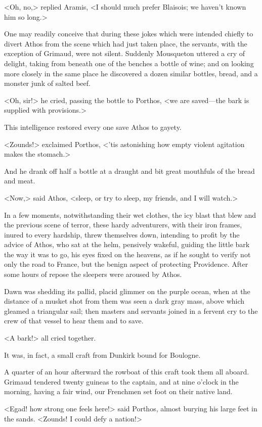 <Oh, no,> replied Aramis, <I should much prefer Blaisois; we haven't known him so long.>

One may readily conceive that during these jokes which were intended chiefly to divert Athos from the scene which had just taken place, the servants, with the exception of Grimaud, were not silent. Suddenly Mousqueton uttered a cry of delight, taking from beneath one of the benches a bottle of wine; and on looking more closely in the same place he discovered a dozen similar bottles, bread, and a monster junk of salted beef.

<Oh, sir!> he cried, passing the bottle to Porthos, <we are saved—the bark is supplied with provisions.>

This intelligence restored every one save Athos to gayety.

<Zounds!> exclaimed Porthos, <'tis astonishing how empty violent agitation makes the stomach.>

And he drank off half a bottle at a draught and bit great mouthfuls of the bread and meat.

<Now,> said Athos, <sleep, or try to sleep, my friends, and I will watch.>

In a few moments, notwithstanding their wet clothes, the icy blast that blew and the previous scene of terror, these hardy adventurers, with their iron frames, inured to every hardship, threw themselves down, intending to profit by the advice of Athos, who sat at the helm, pensively wakeful, guiding the little bark the way it was to go, his eyes fixed on the heavens, as if he sought to verify not only the road to France, but the benign aspect of protecting Providence. After some hours of repose the sleepers were aroused by Athos.

Dawn was shedding its pallid, placid glimmer on the purple ocean, when at the distance of a musket shot from them was seen a dark gray mass, above which gleamed a triangular sail; then masters and servants joined in a fervent cry to the crew of that vessel to hear them and to save.

<A bark!> all cried together.

It was, in fact, a small craft from Dunkirk bound for Boulogne.

A quarter of an hour afterward the rowboat of this craft took them all aboard. Grimaud tendered twenty guineas to the captain, and at nine o'clock in the morning, having a fair wind, our Frenchmen set foot on their native land.

<Egad! how strong one feels here!> said Porthos, almost burying his large feet in the sands. <Zounds! I could defy a nation!>

